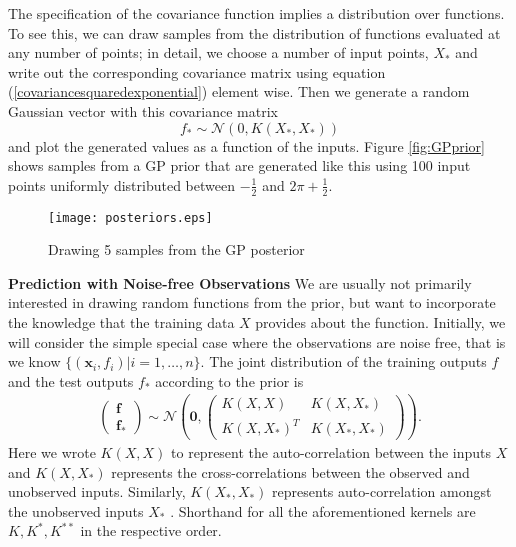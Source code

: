 \documentclass[english]{article}
\begin{document}
 The specification of the covariance function implies a distribution over functions. 
 To see this, we can draw samples from the distribution of functions evaluated at any number of points; in detail, we choose a number of input points, $X_*$ and write out the corresponding covariance matrix using equation (\ref{covariancesquaredexponential}) element wise. 
Then we generate a random Gaussian vector with this covariance matrix
\begin{equation}
	f_* \sim \mathcal{N} (0,K(X_*,X_*))
\end{equation}
and plot the generated values as a function of the inputs. Figure \ref{fig:GPprior} shows samples from a GP prior that are generated like this using 100 input points uniformly distributed between $-\frac12$ and $2\pi + \frac12$. 
\begin{figure}[h]
	\begin{center}
		\texttt{[image: posteriors.eps]}
		\caption{Drawing 5 samples from the GP posterior}
		\label{GPposterior}
	\end{center}
\end{figure}
\newline\newline
\textbf{Prediction with Noise-free Observations}
\newline
We are usually not primarily interested in drawing random functions from the prior, but want to incorporate the knowledge that the training data $X$ provides about the function. Initially, we will consider the simple special case where the observations are noise free, that is we know $\{(\textbf{x}_i , f_i ) | i = 1, \ldots , n\}$. 
The joint distribution of the training outputs $f$ and the test outputs $f_*$ according to the prior is
\begin{align}
	\begin{pmatrix}
	\textbf{f} \\
	\textbf{f}_*
	\end{pmatrix}
	\sim \mathcal{N} \left( \textbf{0},
	\begin{pmatrix}
	K(X,X) & K(X,X_*) \\
	K(X,X_*)^T & K(X_*, X_*)
	\end{pmatrix}
	\right).
\end{align}
Here we wrote $K(X,X)$ to represent the auto-correlation between the inputs $X$ and $K(X,X_*)$ represents the cross-correlations between the observed and unobserved inputs. Similarly, $K(X_*,X_*)$ represents auto-correlation amongst the unobserved inputs $X_*$ . Shorthand for all the aforementioned kernels are $K, K^*, K^{**}$ in the respective order.
\end{document}

